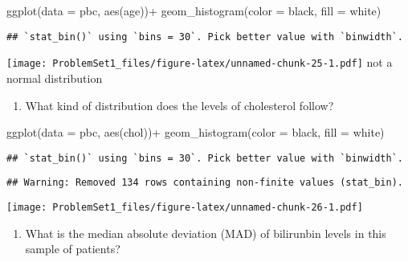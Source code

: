 \documentclass[
]{article}
\newenvironment{Shaded}{\begin{snugshade}}{\end{snugshade}}
\newcommand{\AttributeTok}[1]{\textcolor[rgb]{0.77,0.63,0.00}{#1}}
\newcommand{\FunctionTok}[1]{\textcolor[rgb]{0.00,0.00,0.00}{#1}}
\newcommand{\NormalTok}[1]{#1}
\newcommand{\SpecialCharTok}[1]{\textcolor[rgb]{0.00,0.00,0.00}{#1}}
\newcommand{\StringTok}[1]{\textcolor[rgb]{0.31,0.60,0.02}{#1}}
\providecommand{\tightlist}{%
  \setlength{\itemsep}{0pt}\setlength{\parskip}{0pt}}
\begin{document}
\begin{Shaded}
\begin{Highlighting}[]
\FunctionTok{ggplot}\NormalTok{(}\AttributeTok{data =}\NormalTok{ pbc, }\FunctionTok{aes}\NormalTok{(age))}\SpecialCharTok{+}
  \FunctionTok{geom\_histogram}\NormalTok{(}\AttributeTok{color =} \StringTok{\textquotesingle{}black\textquotesingle{}}\NormalTok{,}
                 \AttributeTok{fill =} \StringTok{\textquotesingle{}white\textquotesingle{}}\NormalTok{)}
\end{Highlighting}
\end{Shaded}

\begin{verbatim}
## `stat_bin()` using `bins = 30`. Pick better value with `binwidth`.
\end{verbatim}

\texttt{[image: ProblemSet1\_files/figure-latex/unnamed-chunk-25-1.pdf]}
not a normal distribution

\begin{enumerate}
\def\labelenumi{\alph{enumi})}
\setcounter{enumi}{1}
\tightlist
\item
  What kind of distribution does the levels of cholesterol follow?
\end{enumerate}

\begin{Shaded}
\begin{Highlighting}[]
\FunctionTok{ggplot}\NormalTok{(}\AttributeTok{data =}\NormalTok{ pbc, }\FunctionTok{aes}\NormalTok{(chol))}\SpecialCharTok{+}
  \FunctionTok{geom\_histogram}\NormalTok{(}\AttributeTok{color =} \StringTok{\textquotesingle{}black\textquotesingle{}}\NormalTok{,}
                 \AttributeTok{fill =} \StringTok{\textquotesingle{}white\textquotesingle{}}\NormalTok{)}
\end{Highlighting}
\end{Shaded}

\begin{verbatim}
## `stat_bin()` using `bins = 30`. Pick better value with `binwidth`.
\end{verbatim}

\begin{verbatim}
## Warning: Removed 134 rows containing non-finite values (stat_bin).
\end{verbatim}

\texttt{[image: ProblemSet1\_files/figure-latex/unnamed-chunk-26-1.pdf]}

\begin{enumerate}
\def\labelenumi{\alph{enumi})}
\setcounter{enumi}{2}
\tightlist
\item
  What is the median absolute deviation (MAD) of bilirunbin levels in
  this sample of patients?
\end{enumerate}
\end{document}
